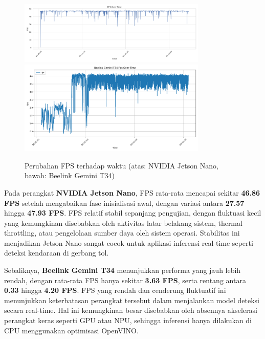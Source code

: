 \begin{figure}[htbp]
  \centering
  \includegraphics[width=0.8\textwidth]{gambar/bab4-jetson-fps-over-time.png}
  \includegraphics[width=0.8\textwidth]{gambar/bab4-beelink-fps-over-time.png}
  \caption{\centering Perubahan FPS terhadap waktu (atas: NVIDIA Jetson Nano, bawah: Beelink Gemini T34)}
  \label{fig:fps_over_time}
\end{figure}

Pada perangkat \textbf{NVIDIA Jetson Nano}, FPS rata-rata mencapai sekitar \textbf{46.86 FPS} setelah mengabaikan fase inisialisasi awal, dengan variasi antara \textbf{27.57} hingga \textbf{47.93 FPS}. FPS relatif stabil sepanjang pengujian, dengan fluktuasi kecil yang kemungkinan disebabkan oleh aktivitas latar belakang sistem, thermal throttling, atau pengelolaan sumber daya oleh sistem operasi. Stabilitas ini menjadikan Jetson Nano sangat cocok untuk aplikasi inferensi real-time seperti deteksi kendaraan di gerbang tol.

Sebaliknya, \textbf{Beelink Gemini T34} menunjukkan performa yang jauh lebih rendah, dengan rata-rata FPS hanya sekitar \textbf{3.63 FPS}, serta rentang antara \textbf{0.33} hingga \textbf{4.20 FPS}. FPS yang rendah dan cenderung fluktuatif ini menunjukkan keterbatasan perangkat tersebut dalam menjalankan model deteksi secara real-time. Hal ini kemungkinan besar disebabkan oleh absennya akselerasi perangkat keras seperti GPU atau NPU, sehingga inferensi hanya dilakukan di CPU menggunakan optimisasi OpenVINO.



